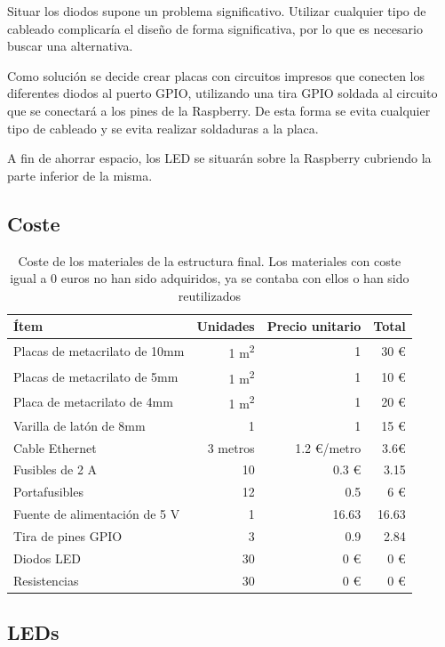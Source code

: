 Situar los diodos supone un problema significativo. Utilizar cualquier tipo de cableado complicaría el diseño de forma significativa, por lo que es necesario buscar una alternativa.

Como solución se decide crear placas con circuitos impresos que conecten los diferentes diodos al puerto GPIO, utilizando una tira GPIO soldada al circuito que se conectará a los pines de la Raspberry. De esta forma se evita cualquier tipo de cableado y se evita realizar soldaduras a la placa.

A fin de ahorrar espacio, los LED se situarán sobre la Raspberry cubriendo la parte inferior de la misma.

\subsection{Coste}
\label{coste}
\begin{table}[H]
\centering
\begin{tabular}{|l|r|r|r|}
\hline
\textbf{Ítem} & \textbf{Unidades} & \textbf{Precio unitario} & \textbf{Total} \\ \hline
Placas de metacrilato de 10mm & 1 m\textsuperscript{2} & 1 & 30 € \\ \hline
Placas de metacrilato de 5mm & 1 m\textsuperscript{2} & 1 & 10 € \\ \hline
Placa de metacrilato de 4mm & 1 m\textsuperscript{2} & 1 & 20 € \\ \hline
Varilla de latón de 8mm & 1 & 1& 15 €\\ \hline
Cable Ethernet & 3 metros & 1.2 €/metro & 3.6€\\ \hline
Fusibles de 2 A & 10 & 0.3 € & 3.15\\ \hline
Portafusibles & 12 & 0.5 & 6 € \\ \hline
Fuente de alimentación de 5 V & 1 & 16.63 & 16.63 \\ \hline
Tira de pines GPIO & 3 & 0.9 & 2.84 \\ \hline
Diodos LED & 30 & 0 € & 0 €\\ \hline
Resistencias & 30 & 0 € & 0 €\\ \hline
\end{tabular}
\caption{Coste de los materiales de la estructura final. Los materiales con coste igual a 0 euros no han sido adquiridos, ya se contaba con ellos o han sido reutilizados}
\end{table}

\subsection{LEDs}

